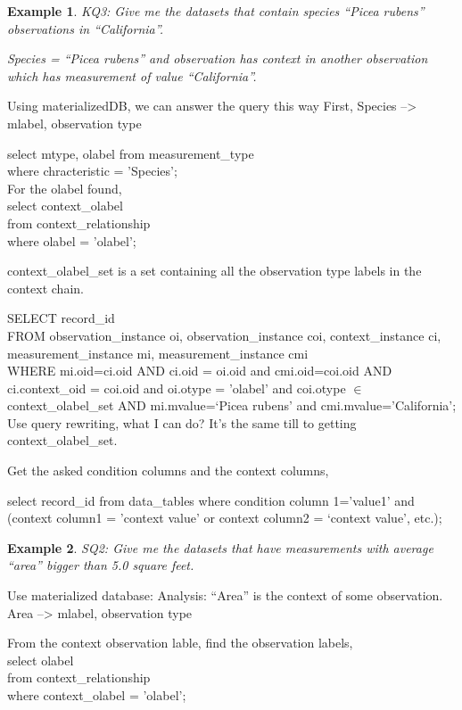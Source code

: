 \documentclass[conference]{IEEEtran}
\newtheorem{example}{Example}[section]
\begin{document}
\begin{example}
KQ3: Give me the datasets that contain species ``Picea rubens''
  observations in ``California''. 

Species = ``Picea rubens'' and observation has context {\em in}
another observation which has measurement of value ``California''. 
\end{example}

Using materializedDB, we can answer the query this way
First, Species --> mlabel, observation type 

select mtype, olabel from measurement\_type  \\
where chracteristic = 'Species';  \\

For the olabel found, \\
select context\_olabel\\
from context\_relationship\\
where olabel = 'olabel'; 

context\_olabel\_set is a set containing all the observation type
labels in the context chain. 

SELECT record\_id\\
FROM observation\_instance oi, observation\_instance coi,
context\_instance ci,
measurement\_instance mi, measurement\_instance cmi \\
WHERE mi.oid=ci.oid AND ci.oid = oi.oid and  cmi.oid=coi.oid AND ci.context\_oid =
coi.oid and oi.otype = 'olabel' and coi.otype $\in$
context\_olabel\_set
AND mi.mvalue=`Picea rubens' and cmi.mvalue='California';\\

Use query rewriting, what I can do? 
It's the same till to getting context\_olabel\_set. 

Get the asked condition columns and the context columns, 

select record\_id from data\_tables
where condition column 1='value1' and (context column1 = 'context
value' or context column2 = `context value', etc.);

\begin{example}
SQ2: Give me the datasets that have measurements with average ``area''
bigger than 5.0 square feet. 
\end{example}

Use materialized database: 
Analysis: ``Area'' is the context of some observation.
Area --> mlabel, observation type

From the context observation lable, find the observation labels, \\
select olabel\\
from context\_relationship\\
where context\_olabel = 'olabel'; 
\end{document}
